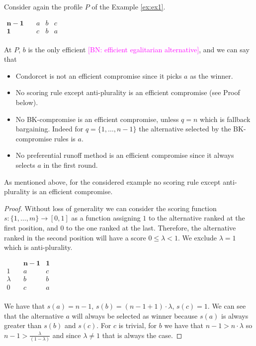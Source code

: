 \documentclass[version=3.21, pagesize, notitlepage, twoside=off, bibliography=totoc, DIV=calc, fontsize=12pt, a4paper]{scrartcl}
\newcommand{\commentBN}[1]{\textcolor{magenta}{\small$\big[$BN: #1$\big]$}}
\begin{document}
\noindent Consider again the profile $P$ of the Example \ref{ex:ex1}. 
	\begin{center}
		$
		\begin{array}{cccc}
		\mathbf{n-1} \quad &a&b&c\\
		\mathbf{1} \quad &c&b&a\\
		\end{array}
		$
	\end{center}
	At $P$, $b$ is the only efficient \commentBN{efficient egalitarian alternative}, and we can say that 
\begin{itemize}
	\item Condorcet is not an efficient compromise since it picks $a$ as the winner.
	\item No scoring rule except anti-plurality is an efficient compromise (see Proof below).
	\item No BK-compromise is an efficient compromise, unless $q=n$ which is fallback bargaining. Indeed for $q=\{1,\dots, n-1\}$ the alternative selected by the BK-compromise rules is $a$.
	\item No preferential runoff method is an efficient compromise since it always selects $a$ in the first round.
\end{itemize}
As mentioned above, for the considered example no scoring rule except anti-plurality is an efficient compromise.
\begin{proof} Without loss of generality we can consider the scoring function $s:\{1,\dots,m\}\rightarrow [0,1]$ as a function assigning $1$ to the alternative ranked at the first position, and $0$ to the one ranked at the last. Therefore, the alternative ranked in the second position will have a score $0 \leq \lambda<1$. We exclude $\lambda = 1$ which is anti-plurality.
	\begin{center}
		$
		\begin{array}{ccc}
		\quad & \mathbf{n-1} &\mathbf{1}\\
		1 \quad &a&c\\
		\lambda \quad &b&b\\
		0 \quad &c&a\\
		\end{array}
		$
	\end{center}
	We have that $s(a)=n-1$, $s(b)=(n-1+1)\cdot \lambda$, $s(c)=1$. We can see that the alternative $a$ will always be selected as winner because $s(a)$ is always greater than $s(b)$ and $s(c)$. For $c$ is trivial, for $b$ we have that $n-1>n\cdot\lambda$ so $n-1>\frac{\lambda}{(1-\lambda)}$ and since $\lambda \neq 1$ that is always the case.
\end{proof}
\end{document}
